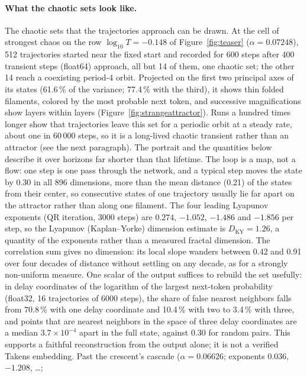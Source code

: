 \documentclass[11pt,letterpaper]{article}
\begin{document}
\paragraph{What the chaotic sets look like.} The chaotic sets that the trajectories approach can be drawn. At the cell of strongest chaos on
the row $\log_{10}T=-0.148$ of Figure~\ref{fig:teaser} ($\alpha=0.07248$), 512 trajectories started near the fixed
start and recorded for 600 steps after 400 transient steps (float64) approach, all but 14 of them, one
chaotic set; the other 14 reach a coexisting period-4 orbit. Projected on the first two principal axes
of its states (61.6\,\% of the variance; 77.4\,\% with the third), it shows thin folded filaments, colored by the most
probable next token, and successive magnifications show layers within layers (Figure~\ref{fig:strangeattractor}). Runs
a hundred times longer show that trajectories leave this set for a periodic orbit at a steady rate, about one in
60\,000 steps, so it is a long-lived chaotic transient rather than an attractor (see the next paragraph). The
portrait and the quantities below describe it over horizons far shorter than that lifetime. The loop is a map, not a
flow: one step is one pass through the network, and a typical step moves the state by 0.30 in all 896 dimensions,
more than the mean distance (0.21) of the states from their center, so consecutive states of one trajectory usually
lie far apart on the attractor rather than along one filament. The four leading Lyapunov exponents (QR iteration, 3000 steps) are $0.274$, $-1.052$,
$-1.486$ and $-1.856$ per step, so the Lyapunov (Kaplan--Yorke) dimension estimate is $D_{\mathrm{KY}}=1.26$, a
quantity of the exponents rather than a measured fractal dimension. The correlation sum gives no dimension: its local
slope wanders between 0.42 and 0.91 over four decades of distance without settling on any decade, as for a strongly
non-uniform measure. One scalar of the output suffices to rebuild the set usefully: in delay coordinates of the
logarithm of the largest next-token probability (float32, 16 trajectories of 6000 steps), the share of false nearest
neighbors falls from 70.8\,\% with one delay coordinate and 10.4\,\% with two to 3.4\,\% with three, and points that are
nearest neighbors in the space of three delay coordinates are a median $3.7\times10^{-4}$ apart in the full state, against 0.30 for random
pairs. This supports a faithful reconstruction from the output alone; it is not a verified Takens embedding. Past the crescent's cascade ($\alpha=0.06626$; exponents $0.036$, $-1.208$, \dots;
\end{document}
